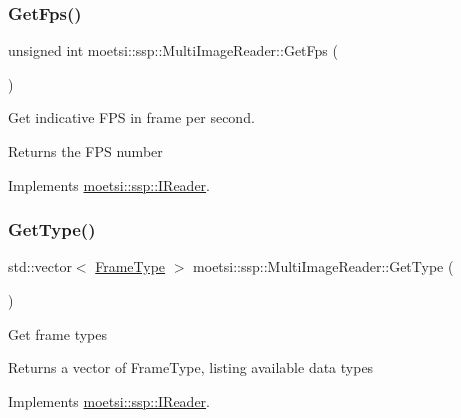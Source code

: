 \subsubsection{\texorpdfstring{Get\+Fps()}{GetFps()}}
{\footnotesize\ttfamily unsigned int moetsi\+::ssp\+::\+Multi\+Image\+Reader\+::\+Get\+Fps (\begin{DoxyParamCaption}{ }\end{DoxyParamCaption})\hspace{0.3cm}{\ttfamily [virtual]}}

Get indicative F\+PS in frame per second. \begin{DoxyReturn}{Returns}
the F\+PS number 
\end{DoxyReturn}


Implements \hyperlink{classmoetsi_1_1ssp_1_1IReader_a9f6a8650ca290b011b8e5451eeae9f32}{moetsi\+::ssp\+::\+I\+Reader}.

\mbox{\label{classmoetsi_1_1ssp_1_1MultiImageReader_ad5f6cf0cfb1e64bcf569ab0bbfcce9d6}} 
\subsubsection{\texorpdfstring{Get\+Type()}{GetType()}}
{\footnotesize\ttfamily std\+::vector$<$ \hyperlink{namespacemoetsi_1_1ssp_a46efdfa2cd5a28ead465dcc8006b5a87}{Frame\+Type} $>$ moetsi\+::ssp\+::\+Multi\+Image\+Reader\+::\+Get\+Type (\begin{DoxyParamCaption}{ }\end{DoxyParamCaption})\hspace{0.3cm}{\ttfamily [virtual]}}

Get frame types \begin{DoxyReturn}{Returns}
a vector of Frame\+Type, listing available data types 
\end{DoxyReturn}


Implements \hyperlink{classmoetsi_1_1ssp_1_1IReader_a4116c1931fde7bd66133934ffdca1cce}{moetsi\+::ssp\+::\+I\+Reader}.

\mbox{\label{classmoetsi_1_1ssp_1_1MultiImageReader_a7c552a1ad469660ea0a88b9ca85138ad}} 
